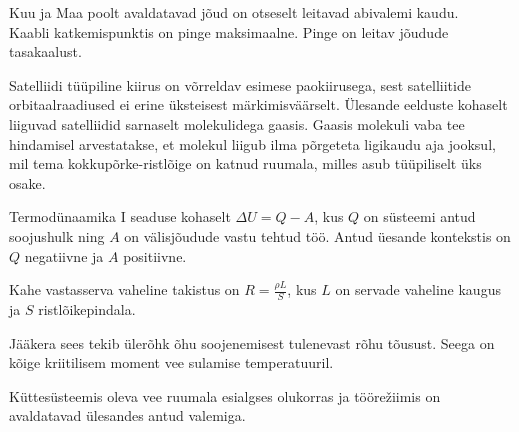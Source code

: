 \documentclass[10pt]{article}
\begin{document}
{
\hint
\osa Kuu ja Maa poolt avaldatavad jõud on otseselt leitavad abivalemi kaudu.\\
\osa Kaabli katkemispunktis on pinge maksimaalne. Pinge on leitav jõudude tasakaalust.
\probend
\bigskip


\hint
Satelliidi tüüpiline kiirus on võrreldav esimese paokiirusega, sest satelliitide orbitaalraadiused ei erine üksteisest märkimisväärselt. Ülesande eelduste kohaselt liiguvad satelliidid sarnaselt molekulidega gaasis. Gaasis molekuli vaba tee hindamisel arvestatakse, et molekul liigub ilma põrgeteta ligikaudu aja jooksul, mil tema kokkupõrke-ristlõige on katnud ruumala, milles asub tüüpiliselt üks osake.
\probend
\bigskip


\hint
Termodünaamika I seaduse kohaselt $\Delta U = Q - A$, kus $Q$ on süsteemi antud soojushulk ning $A$ on välisjõudude vastu tehtud töö. Antud üesande kontekstis on $Q$ negatiivne ja $A$ positiivne.
\probend
\bigskip


\hint
Kahe vastasserva vaheline takistus on $R = \frac{\rho L}{S}$, kus $L$ on servade vaheline kaugus ja $S$ ristlõikepindala.
\probend
\bigskip


\hint
Jääkera sees tekib ülerõhk õhu soojenemisest tulenevast rõhu tõusust. Seega on kõige kriitilisem moment vee sulamise temperatuuril.
\probend
\bigskip


\hint
Küttesüsteemis oleva vee ruumala esialgses olukorras ja töörežiimis on avaldatavad ülesandes antud valemiga.
\probend
\bigskip


}
\end{document}
